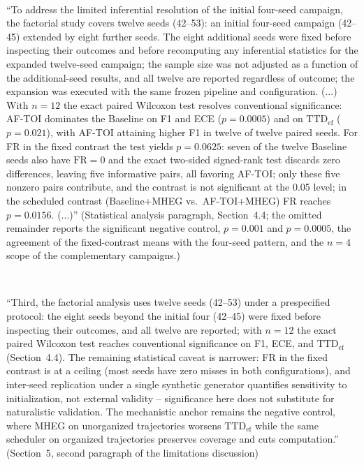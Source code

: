 \documentclass[1p,12pt,authoryear]{elsarticle}
\begin{document}
~

``To address the limited inferential resolution of the initial four-seed campaign, the factorial study covers twelve seeds (42--53): an initial four-seed campaign (42--45) extended by eight further seeds. The eight additional seeds were fixed before inspecting their outcomes and before recomputing any inferential statistics for the expanded twelve-seed campaign; the sample size was not adjusted as a function of the additional-seed results, and all twelve are reported regardless of outcome; the expansion was executed with the same frozen pipeline and configuration. (...) With $n=12$ the exact paired Wilcoxon test resolves conventional significance: AF-TOI dominates the Baseline on F1 and ECE ($p=0.0005$) and on $\mathrm{TTD}_{\mathrm{ef}}$ ($p=0.021$), with AF-TOI attaining higher F1 in twelve of twelve paired seeds. For FR in the fixed contrast the test yields $p=0.0625$: seven of the twelve Baseline seeds also have $\mathrm{FR}=0$ and the exact two-sided signed-rank test discards zero differences, leaving five informative pairs, all favoring AF-TOI; only these five nonzero pairs contribute, and the contrast is not significant at the 0.05 level; in the scheduled contrast (Baseline+MHEG vs.\ AF-TOI+MHEG) FR reaches $p=0.0156$. (...)'' (Statistical analysis paragraph, Section~4.4; the omitted remainder reports the significant negative control, $p=0.001$ and $p=0.0005$, the agreement of the fixed-contrast means with the four-seed pattern, and the $n{=}4$ scope of the complementary campaigns.)

~

``Third, the factorial analysis uses twelve seeds (42--53) under a prespecified protocol: the eight seeds beyond the initial four (42--45) were fixed before inspecting their outcomes, and all twelve are reported; with $n=12$ the exact paired Wilcoxon test reaches conventional significance on F1, ECE, and $\mathrm{TTD}_{\mathrm{ef}}$ (Section~4.4). The remaining statistical caveat is narrower: FR in the fixed contrast is at a ceiling (most seeds have zero misses in both configurations), and inter-seed replication under a single synthetic generator quantifies sensitivity to initialization, not external validity -- significance here does not substitute for naturalistic validation. The mechanistic anchor remains the negative control, where MHEG on unorganized trajectories worsens $\mathrm{TTD}_{\mathrm{ef}}$ while the same scheduler on organized trajectories preserves coverage and cuts computation.'' (Section~5, second paragraph of the limitations discussion)
\end{document}
